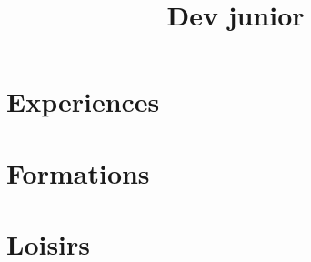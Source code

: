 \documentclass[11pt,a4paper]{moderncv}
\title{Dev junior}
\begin{document}
\makecvtitle
\section{Experiences}
\section{Formations}
\section{Loisirs}
\end{document}
